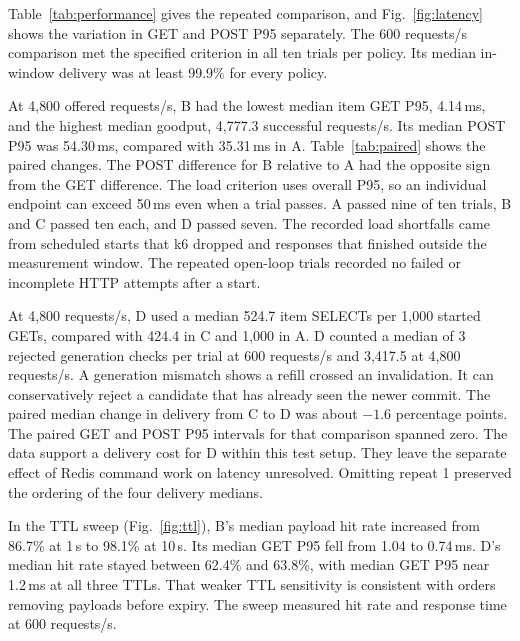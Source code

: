 Table~\ref{tab:performance} gives the repeated comparison, and Fig.~\ref{fig:latency} shows the variation in GET and POST P95 separately. The 600 requests/s comparison met the specified criterion in all ten trials per policy. Its median in-window delivery was at least 99.9\% for every policy.

At 4{,}800 offered requests/s, B had the lowest median item GET P95, 4.14\,ms, and the highest median goodput, 4{,}777.3 successful requests/s. Its median POST P95 was 54.30\,ms, compared with 35.31\,ms in A. Table~\ref{tab:paired} shows the paired changes. The POST difference for B relative to A had the opposite sign from the GET difference. The load criterion uses overall P95, so an individual endpoint can exceed 50\,ms even when a trial passes. A passed nine of ten trials, B and C passed ten each, and D passed seven. The recorded load shortfalls came from scheduled starts that k6 dropped and responses that finished outside the measurement window. The repeated open-loop trials recorded no failed or incomplete HTTP attempts after a start.

At 4{,}800 requests/s, D used a median 524.7 item SELECTs per 1{,}000 started GETs, compared with 424.4 in C and 1{,}000 in A. D counted a median of 3 rejected generation checks per trial at 600 requests/s and 3{,}417.5 at 4{,}800 requests/s. A generation mismatch shows a refill crossed an invalidation. It can conservatively reject a candidate that has already seen the newer commit. The paired median change in delivery from C to D was about \(-1.6\) percentage points. The paired GET and POST P95 intervals for that comparison spanned zero. The data support a delivery cost for D within this test setup. They leave the separate effect of Redis command work on latency unresolved. Omitting repeat 1 preserved the ordering of the four delivery medians.

In the TTL sweep (Fig.~\ref{fig:ttl}), B's median payload hit rate increased from 86.7\% at 1\,s to 98.1\% at 10\,s. Its median GET P95 fell from 1.04 to 0.74\,ms. D's median hit rate stayed between 62.4\% and 63.8\%, with median GET P95 near 1.2\,ms at all three TTLs. That weaker TTL sensitivity is consistent with orders removing payloads before expiry. The sweep measured hit rate and response time at 600 requests/s.
